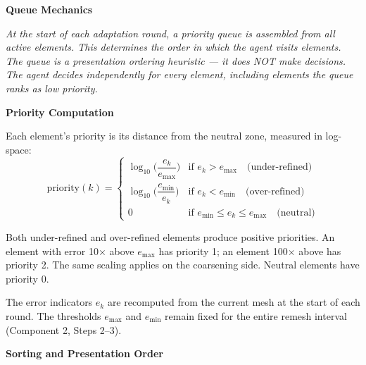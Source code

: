 \documentclass[11pt]{article}
\begin{document}
\begin{center}
{\Large\bfseries Queue Mechanics}
\end{center}

\vspace{0.15cm}
\noindent\textit{At the start of each adaptation round, a priority queue is assembled from all active elements. This determines the order in which the agent visits elements. The queue is a presentation ordering heuristic --- it does NOT make decisions. The agent decides independently for every element, including elements the queue ranks as low priority.}

\vspace{0.5cm}
\noindent\textbf{\textcolor{roundcolor}{Priority Computation}}

\vspace{0.15cm}
\noindent Each element's priority is its distance from the neutral zone, measured in log-space:
\begin{equation}
\text{priority}(k) = 
\begin{cases}
\log_{10}\!\Big(\dfrac{e_k}{e_{\max}}\Big) & \text{if } e_k > e_{\max} \quad \text{(under-refined)} \\[10pt]
\log_{10}\!\Big(\dfrac{e_{\min}}{e_k}\Big) & \text{if } e_k < e_{\min} \quad \text{(over-refined)} \\[10pt]
0 & \text{if } e_{\min} \leq e_k \leq e_{\max} \quad \text{(neutral)}
\end{cases}
\label{eq:priority}
\end{equation}

\noindent Both under-refined and over-refined elements produce positive priorities. An element with error 10$\times$ above $e_{\max}$ has priority 1; an element 100$\times$ above has priority 2. The same scaling applies on the coarsening side. Neutral elements have priority 0.

\vspace{0.15cm}
\noindent The error indicators $e_k$ are recomputed from the current mesh at the start of each round. The thresholds $e_{\max}$ and $e_{\min}$ remain fixed for the entire remesh interval (\textrightarrow\;Component 2, Steps 2--3).

\vspace{0.5cm}
\noindent\textbf{\textcolor{roundcolor}{Sorting and Presentation Order}}
\end{document}
